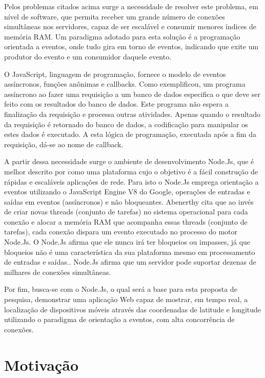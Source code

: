   Pelos problemas citados acima surge a necessidade de resolver este problema, 
  em nível de software, que permita receber um grande número de conexões simultâneas 
  nos servidores, capaz de ser escalável e consumir menores índices de memória RAM. 
  Um paradigma adotado para esta solução é a programação orientada a eventos, onde tudo gira em torno de eventos, 
  indicando que exite um produtor do evento e um consumidor daquele evento.\cite{Junior:2012}
  
  O JavaScript, linguagem de programação, fornece o modelo de eventos assíncronos, funções anônimas e callbacks. 
  Como  exemplificou, um programa assíncrono ao fazer uma requisição a um banco de dados especifica 
  o que deve ser feito com os resultados do banco de dados. 
  Este programa não espera a finalização da requisição e processa outras atividades. 
  Apenas quando o resultado da requisição é retornado do banco de dados, a codificação para manipular os estes dados 
  é executado. A esta lógica de programação, executada após a fim da requisição, dá-se ao nome de callback.\cite[p. 2]{Junior:2012} 
  
  A partir dessa necessidade surge o ambiente de desenvolvimento Node.Js, 
  que é melhor descrito por  como uma plataforma cujo o objetivo é a fácil 
  construção de rápidas e escaláveis aplicações de rede. Para isto o Node.Js emprega orientação 
  a eventos utilizando o JavaScript Engine V8 do Google, operações de entradas e saídas em eventos (assíncronos) 
  e não bloqueantes. Abenerthy cita que ao invés de criar novas threads (conjunto de tarefas) no sistema operacional 
  para cada conexão e alocar a memória RAM que acompanha essas threads (conjunto de tarefas), 
  cada conexão dispara um evento executado no processo do motor Node.Js. 
  O Node.Js afirma que ele nunca irá ter bloqueios ou impasses, já que bloqueios não é uma característica 
  da sua plataforma mesmo em processamento de entradas e saídas.. Node.Js afirma que um servidor pode suportar 
  dezenas de milhares de conexões simultâneas.\cite{Abernethy:2011}
  
  Por fim, busca-se com o Node.Js, o qual será a base para esta proposta de pesquisa, 
  demonstrar uma aplicação Web capaz de mostrar, em tempo real, a localização de dispositivos móveis através 
  das coordenadas de latitude e longitude utilizando o paradigma de orientação a eventos, 
  com alta concorrência de conexões.
  
\section{Motivação}
\label{motivacao}
  
